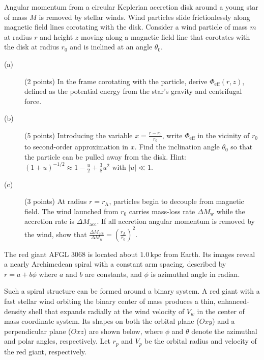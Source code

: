 Angular momentum from a circular Keplerian accretion disk around a young star
of mass $M$ is removed by stellar winds. Wind particles slide frictionlessly
along magnetic field lines corotating with the disk. Consider a wind particle
of mass $m$ at radius $r$ and height $z$ moving along a magnetic field line
that corotates with the disk at radius $r_0$ and is inclined at an angle
$\theta_0$.


\begin{description}
\item[(a)] (2 points) In the frame corotating with the particle, derive
  $\Phi_{\mathrm{eff}}(r, z)$, defined as the potential energy from the
  star's gravity and centrifugal force.
\item[(b)] (5 points) Introducing the variable $x = \frac{r - r_0}{r_0}$,
  write $\Phi_{\mathrm{eff}}$ in the vicinity of $r_0$ to second-order
  approximation in $x$. Find the inclination angle $\theta_0$ so that the
  particle can be pulled away from the disk. Hint:
  $(1 + u)^{-1/2} \approx 1 - \frac{u}{2} + \frac{3}{8}u^2$ with
  $|u| \ll 1$.
\item[(c)] (3 points) At radius $r = r_{\mathrm{A}}$, particles begin to
  decouple from magnetic field. The wind launched from $r_0$ carries
  mass-loss rate $\Delta M_{\mathrm{w}}$ while the accretion rate is
  $\Delta M_{\mathrm{acc}}$. If all accretion angular momentum is removed by
  the wind, show that
  $\frac{\Delta M_{\mathrm{acc}}}{\Delta M_{\mathrm{w}}}
   = \left(\frac{r_{\mathrm{A}}}{r_0}\right)^2$.
\end{description}

The red giant AFGL 3068 is located about $1.0\,\mathrm{kpc}$ from Earth. Its
images reveal a nearly Archimedean spiral with a constant arm spacing,
described by $r = a + b\phi$ where $a$ and $b$ are constants, and $\phi$ is
azimuthal angle in radian.


Such a spiral structure can be formed around a binary system. A red giant with
a fast stellar wind orbiting the binary center of mass produces a thin,
enhanced-density shell that expands radially at the wind velocity of $V_w$ in
the center of mass coordinate system. Its shapes on both the orbital plane
($Oxy$) and a perpendicular plane ($Oxz$) are shown below, where $\phi$ and
$\theta$ denote the azimuthal and polar angles, respectively. Let $r_p$ and
$V_p$ be the orbital radius and velocity of the red giant, respectively.

